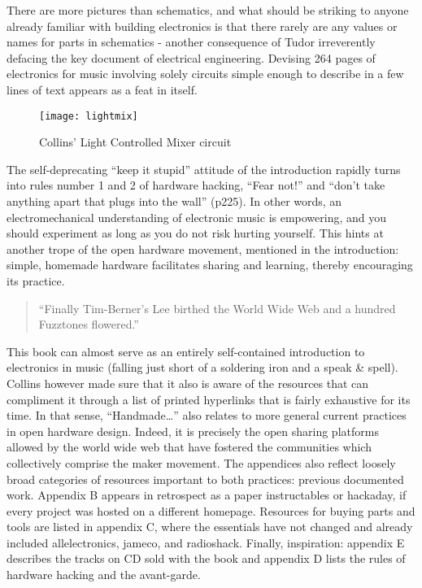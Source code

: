 \begin{itemize}
There are more pictures than schematics, and what should be striking to anyone already familiar with building electronics is that there rarely are any values or names for parts in schematics - another consequence of Tudor irreverently defacing the key document of electrical engineering. Devising 264 pages of electronics for music involving solely circuits simple enough to describe in a few lines of text appears as a feat in itself. 

	\begin{figure}[h!]
	  \caption{Collins' Light Controlled Mixer circuit}
	  \centering
	    \texttt{[image: lightmix]}
	\end{figure}

The self-deprecating “keep it stupid” attitude of the introduction rapidly turns into rules number 1 and 2 of hardware hacking, “Fear not!” and “don’t take anything apart that plugs into the wall” (p225). In other words, an electromechanical understanding of electronic music is empowering, and you should experiment as long as you do not risk hurting yourself. This hints at another trope of the open hardware movement, mentioned in the introduction: simple, homemade hardware facilitates sharing and learning, thereby encouraging its practice.

\begin{quote}

“Finally Tim-Berner’s Lee birthed the World Wide Web and a hundred Fuzztones flowered.” 
	
\cite[p211]{collins2006}

\end{quote}

This book can almost serve as an entirely self-contained introduction to electronics in music (falling just short of a soldering iron and a speak \& spell). Collins however made sure that it also is aware of the resources that can compliment it through a list of printed hyperlinks that is fairly exhaustive for its time. In that sense, “Handmade…” also relates to more general current practices in open hardware design. Indeed, it is precisely the open sharing platforms allowed by the world wide web that have fostered the communities which collectively comprise the maker movement. The appendices also reflect loosely broad categories of resources important to both practices: previous documented work. Appendix B appears in retrospect as a paper instructables or hackaday, if every project was hosted on a different homepage. Resources for buying parts and tools are listed in appendix C, where the essentials have not changed and already included allelectronics, jameco, and radioshack. Finally, inspiration: appendix E describes the tracks on CD sold with the book and appendix D lists the rules of hardware hacking and the avant-garde. 
	

\end{itemize}
